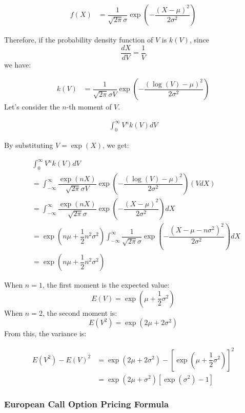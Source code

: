 \documentclass[uplatex]{jsarticle}
\begin{document}
\begin{align}
	f(X) & = \dfrac{1}{\sqrt{2 \pi} \sigma } \exp \left( - \dfrac{(X - \mu )^{2}}{2 \sigma^{2}} \right)
\end{align}

Therefore, if the probability density function of $V$ is $k(V)$, since
$$
	\dfrac{dX}{dV} = \dfrac{1}{V}
$$
we have:

\begin{align}
	k(V) & = \dfrac{1}{\sqrt{2 \pi} \sigma V} \exp \left( - \dfrac{(\log{(V)}- \mu )^{2}}{2 \sigma^{2}} \right)
\end{align}
Let's consider the $n$-th moment of $V$.

\begin{align}
	\int^{\infty}_{0} V^{n} k(V) dV
\end{align}

By substituting $V = \exp(X)$, we get:

\begin{align}
	 & \int^{\infty}_{0} V^{n} k(V) dV\\
	 & = \int^{\infty}_{-\infty} \dfrac{\exp(nX)}{\sqrt{2 \pi} \sigma V} \exp \left( - \dfrac{(\log{(V)}- \mu )^{2}}{2 \sigma^{2}} \right) (VdX)\\
	 & = \int^{\infty}_{-\infty} \dfrac{\exp(nX)}{\sqrt{2 \pi} \sigma} \exp \left( - \dfrac{(X- \mu )^{2}}{2 \sigma^{2}} \right) dX \\
	 & = \exp(n \mu + \dfrac{1}{2} n^{2} \sigma^{2} ) \int^{\infty}_{-\infty} \dfrac{1}{\sqrt{2 \pi} \sigma } \exp \left( - \dfrac{(X- \mu -n \sigma^{2})^{2}}{2 \sigma^{2}} \right) dX \\
	 & = \exp(n \mu + \dfrac{1}{2} n^{2} \sigma^{2} )
\end{align}

When $n=1$, the first moment is the expected value:
$$
	E(V) = \exp(\mu + \dfrac{1}{2} \sigma^{2} )
$$
When $n=2$, the second moment is:
$$
	E(V^{2}) = \exp(2\mu + 2 \sigma^{2} )
$$
From this, the variance is:

\begin{align}
	E(V^{2}) - E(V)^{2} & = \exp(2\mu + 2 \sigma^{2} ) - \left[ \exp(\mu + \dfrac{1}{2} \sigma^{2} ) \right]^{2} \\
	& = \exp(2 \mu + \sigma^{2} ) \left[ \exp( \sigma^{2}) -1 \right]
\end{align}

\subsubsection{European Call Option Pricing Formula}
\end{document}
